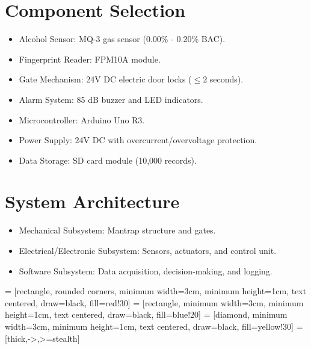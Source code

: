 \documentclass[12pt]{article}
\begin{document}
    \section{Component Selection}
    \label{sec:component_selection}
    \begin{itemize}
        \item Alcohol Sensor: MQ-3 gas sensor (0.00\% - 0.20\% BAC).
        \item Fingerprint Reader: FPM10A module.
        \item Gate Mechanism: 24V DC electric door locks ($\leq 2$ seconds).
        \item Alarm System: 85 dB buzzer and LED indicators.
        \item Microcontroller: Arduino Uno R3\cite{arduino_uno}.
        \item Power Supply: 24V DC with overcurrent/overvoltage protection.
        \item Data Storage: SD card module\cite{data_logging} (10,000 records).
    \end{itemize}

    \section{System Architecture}
    \label{sec:system_architecture}
    \begin{itemize}
        \item Mechanical Subsystem: Mantrap structure and gates.
        \item Electrical/Electronic Subsystem: Sensors, actuators, and control unit.
        \item Software Subsystem: Data acquisition, decision-making, and logging.
    \end{itemize}

 = [rectangle, rounded corners, minimum width=3cm, minimum height=1cm, text centered, draw=black, fill=red!30]
 = [rectangle, minimum width=3cm, minimum height=1cm, text centered, draw=black, fill=blue!20]
 = [diamond, minimum width=3cm, minimum height=1cm, text centered, draw=black, fill=yellow!30]
 = [thick,->,>=stealth]
\end{document}
